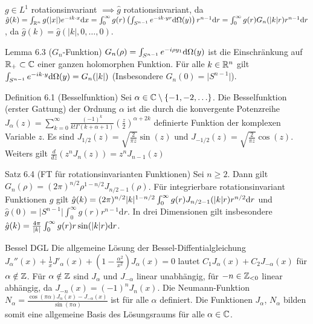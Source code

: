 $g\in L^1$ rotationsinvariant $\implies \hat{g}$ rotationsinvariant, da
$\hat{g}(k)=\int_{\mathbb{R}^n}g(|x|)e^{-ik\cdot x}\mathrm{d}x = \int_0^{\infty}g(r)\left(\int_{S^{n-1}} e^{-ik\cdot yr}\mathrm{d} \Omega(y)\right)r^{n-1}\mathrm{d} r = \int_0^{\infty}g(r)G_n(|k|r)r^{n-1}\mathrm{d} r$, da $\hat{g}(k) = \hat{g}(|k|,0,\ldots,0)$.

\begin{namedtheorem}{Lemma 6.3 ($G_n$-Funktion)}
  $G_n(\rho) = \int_{S^{n-1}} e^{-i\rho y_1} \mathrm{d} \Omega(y)$ ist die Einschränkung auf $\mathbb{R}_{+} \subset \mathbb{C}$ einer ganzen holomorphen Funktion. Für alle $k\in\mathbb{R}^n$ gilt $\int_{S^{n-1}} e^{-ik\cdot y} \mathrm{d} \Omega(y) = G_n(|k|)$ (Insbesondere $G_n(0) = \vert S^{n - 1} \vert$).
\end{namedtheorem}

\begin{namedtheorem}{Definition 6.1 (Besselfunktion)}
  Sei $\alpha\in\mathbb{C}\setminus\{-1,-2,\ldots\}$. Die Besselfunktion (erster Gattung) der Ordnung $\alpha$ ist die durch die konvergente Potenzreihe $J_{\alpha}(z) = \sum_{k=0}^{\infty}\frac{(-1)^k}{k!\Gamma(k+\alpha+1)} \left(\frac{z}2\right)^{\alpha+2k}$ definierte Funktion der komplexen Variable $z$. Es sind $J_{1/2}(z)=\sqrt{\frac2{\pi z}}\sin(z)$ und $J_{-1/2}(z)=\sqrt{\frac2{\pi z}}\cos(z)$. Weiters gilt $\frac{d}{dz}(z^nJ_n(z)) = z^nJ_{n - 1}(z)$
\end{namedtheorem}

\begin{namedtheorem}{Satz 6.4 (FT für rotationsinvarianten Funktionen)}
  Sei $n\geq 2$. Dann gilt $G_n(\rho) = (2\pi)^{n/2} \rho^{1-n/2} J_{n/2-1}(\rho)$. Für integrierbare rotationsinvariant Funktionen $g$ gilt $\hat{g}(k) = (2\pi)^{n/2}|k|^{1-n/2}\int_0^{\infty} g(r) J_{n/2 -1}(|k|r)r^{n/2} \mathrm{d} r$ und $\hat{g}(0) = \vert S^{n - 1}\vert \int_0^\infty g(r)r^{n - 1}\mathrm{d}r$. In drei Dimensionen gilt insbesondere $\hat{g}(k) = \frac{4\pi}{|k|} \int_0^{\infty} g(r) r\sin(|k|r)\mathrm{d} r$.
\end{namedtheorem}

\begin{namedtheorem}{Bessel DGL}
  Die allgemeine Lösung der Bessel-Diffentialgleichung $J_{\alpha}''(x) + \frac1xJ'_{\alpha}(x) + (1-\frac{\alpha^2}{x^2})J_{\alpha}(x) = 0$ lautet $C_1J_{\alpha}(x) + C_2J_{-\alpha}(x)$ für $\alpha\notin\mathbb{Z}$. Für $\alpha\notin\mathbb{Z}$ sind $J_{\alpha}$ und $J_{-\alpha}$ linear unabhängig, für $-n\in\mathbb{Z}_{<0}$ linear abhängig, da $J_{-n}(x)=(-1)^nJ_n(x)$. Die Neumann-Funktion $N_{\alpha}=\frac{\cos(\pi \alpha)J_{\alpha}(x)-J_{-\alpha}(x)}{\sin(\pi\alpha)}$ ist für alle $\alpha$ definiert. Die Funktionen $J_{\alpha}$, $N_{\alpha}$ bilden somit eine allgemeine Basis des Lösungsraums für alle $\alpha\in\mathbb{C}$.
\end{namedtheorem}


